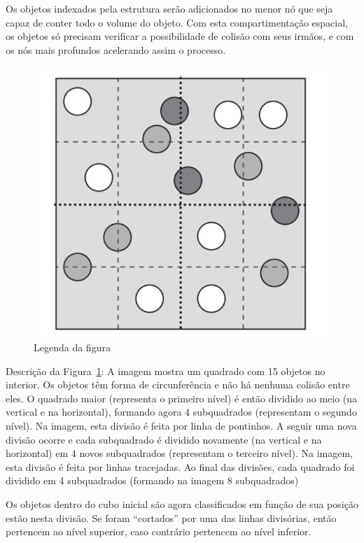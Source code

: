 Os objetos indexados pela estrutura serão adicionados no menor nó que seja capaz de conter todo o volume do objeto.
Com esta compartimentação espacial, os objetos só precisam verificar a possibilidade de colisão com seus irmãos, e com os nós mais profundos acelerando assim o processo.

\begin{figure}[htb]
	\caption{\label{fig:figura1} Legenda da figura}
	\includegraphics[width=\textwidth]{Imagens/Figura_7.11.png}
\end{figure}

Descrição da Figura~\ref{fig:figura1}:
A imagem mostra um quadrado com 15 objetos no interior. Os objetos têm forma de circunferência e não há nenhuma colisão entre eles. O quadrado maior (representa o primeiro nível) é então dividido ao meio (na vertical e na horizontal), formando agora 4 subquadrados (representam o segundo nível). Na imagem, esta divisão é feita por linha de pontinhos. A seguir uma nova divisão ocorre e cada subquadrado é dividido novamente (na vertical e na horizontal) em 4 novos subquadrados (representam o terceiro nível). Na imagem, esta divisão é feita por linhas tracejadas. Ao final das divisões, cada quadrado foi dividido em 4 subquadrados (formando na imagem 8 subquadrados)

Os objetos dentro do cubo inicial são agora classificados em função de sua posição estão nesta divisão. Se foram “cortados” por uma das linhas divisórias, então pertencem ao nível superior, caso contrário pertencem ao nível inferior.

